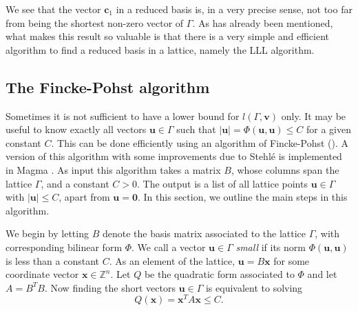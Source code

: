 We see that the vector $\mathbf{c}_1$ in a reduced basis is, in a very precise sense, not too far from being the shortest non-zero vector of $\Gamma$. As has already been mentioned, what makes this result so valuable is that there is a very simple and efficient algorithm to find a reduced basis in a lattice, namely the LLL algorithm.


\subsection{The Fincke-Pohst algorithm}
\label{subsec:FinckePohst}

Sometimes it is not sufficient to have a lower bound for $l(\Gamma,\mathbf{v})$ only. It may be useful to know exactly all vectors $\mathbf{u} \in \Gamma$ such that $|\mathbf{u}|  = \Phi(\mathbf{u}, \mathbf{u}) \leq C$ for a given constant $C$. This can be done efficiently using an algorithm of Fincke-Pohst (). A version of this algorithm with some improvements due to Stehl\'e is implemented in Magma . As input this algorithm takes a matrix $B$, whose columns span the lattice $\Gamma$, and a constant $C > 0$. The output is a list of all lattice points $\mathbf{u} \in \Gamma$ with $|\mathbf{u}| \leq C$, apart from $\mathbf{u} = \mathbf{0}$. In this section, we outline the main steps in this algorithm. 

We begin by letting $B$ denote the basis matrix associated to the lattice $\Gamma$, with corresponding bilinear form $\Phi$. We call a vector $\mathbf{u} \in \Gamma$ \textit{small} if its norm $\Phi(\mathbf{u}, \mathbf{u})$ is less than a constant $C$. As an element of the lattice, $\mathbf{u} = B\mathbf{x}$ for some coordinate vector $\mathbf{x} \in \mathbb{Z}^n$. Let $Q$ be the quadratic form associated to $\Phi$ and let $A=B^TB$. Now finding the short vectors $\mathbf{u} \in \Gamma$ is equivalent to solving 
\begin{equation} \label{eq:ShortVector}
Q(\mathbf{x}) = \mathbf{x}^TA\mathbf{x} \leq C.
\end{equation}

